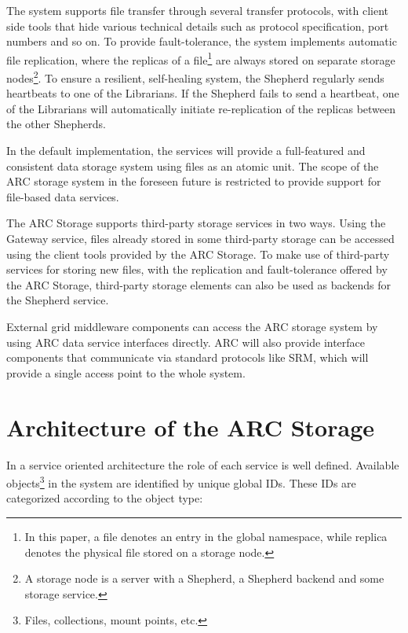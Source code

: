 \documentclass[final]{ieee}
\begin{document}
The system supports file transfer through several transfer protocols,
with client side tools that hide various technical
details such as protocol specification, port numbers
and so on. To provide fault-tolerance, the system implements
automatic file replication, where
the replicas of a file\footnote{In this paper, a file
denotes an entry in the global namespace, while replica denotes the
physical file stored on a storage node.} are always stored on separate
storage nodes\footnote{A
  storage node is a server with a Shepherd, a Shepherd backend
and some storage service.}. To ensure a resilient, self-healing system, the Shepherd
regularly sends heartbeats to one of the Librarians. If the Shepherd fails
to send a heartbeat, one of the Librarians will automatically initiate
re-replication of the replicas between the other Shepherds.

In the default implementation, the services will provide a
full-featured and consistent data storage system using files as an
atomic unit. The scope of the ARC storage system in the foreseen
future is restricted to provide support for file-based data services.

The ARC Storage supports third-party storage services in two
ways. Using the Gateway service, files already stored in some
third-party storage can be accessed using the client tools provided by
the ARC Storage. To make use of third-party services for storing new
files, with the replication and fault-tolerance offered by the ARC
Storage, third-party storage elements can also be used as backends for the
Shepherd service.

External grid middleware components can
access the ARC storage system by using ARC data service
interfaces directly. ARC will also provide interface
components that communicate via standard protocols like SRM, which
will provide a single access point to the whole system.

\section{Architecture of the ARC Storage}
\label{Architecture of the ARC Storage}

In a service oriented architecture
the role of each service is well defined. Available
objects\footnote{Files, collections, mount points, etc.} in the
system are identified by unique global IDs. These IDs are
categorized according to the object type:
\end{document}
